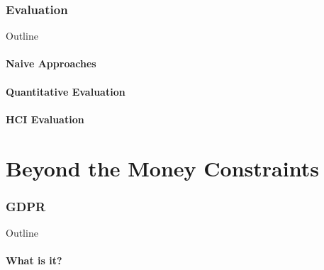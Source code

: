\documentclass[24pt]{beamer}
\begin{document}
\section{Evaluation}

\begin{frame}{Outline}
	\tableofcontents[currentsection]
\end{frame}


\subsection{Naive Approaches}

\begin{frame}
	\sectionpage
	\subsectionpage
\end{frame}


\subsection{Quantitative Evaluation}

\begin{frame}
	\sectionpage
	\subsectionpage
\end{frame}


\subsection{HCI Evaluation}

\begin{frame}
	\sectionpage
	\subsectionpage
\end{frame}


\part{Beyond the Money Constraints}

\begin{frame}
	\partpage
\end{frame}

\section{GDPR}

\begin{frame}{Outline}
	\tableofcontents[currentsection]
\end{frame}

\subsection{What is it?}
\end{document}
